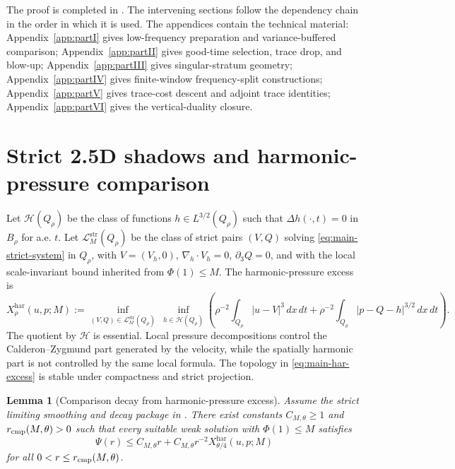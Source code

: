\documentclass[11pt]{article}
\numberwithin{equation}{section}
\theoremstyle{plain}
\newtheorem{lemma}{Lemma}[section]
\theoremstyle{definition}
\theoremstyle{remark}
\newcommand{\har}{\mathrm{har}}
\newcommand{\str}{\mathrm{str}}
\newcommand{\calH}{\mathcal H}
\newcommand{\calL}{\mathcal L}
\begin{document}
The proof is completed in .  The intervening sections follow the dependency chain in the order in which it is used.  The appendices contain the technical material: Appendix~\ref{app:partI} gives low-frequency preparation and variance-buffered comparison; Appendix~\ref{app:partII} gives good-time selection, trace drop, and blow-up; Appendix~\ref{app:partIII} gives singular-stratum geometry; Appendix~\ref{app:partIV} gives finite-window frequency-split constructions; Appendix~\ref{app:partV} gives trace-cost descent and adjoint trace identities; Appendix~\ref{app:partVI} gives the vertical-duality closure.

\section{Strict 2.5D shadows and harmonic-pressure comparison}\label{sec:main-comparison}

Let \(\calH(Q_\rho)\) be the class of functions \(h\in L^{3/2}(Q_\rho)\) such that \(\Delta h(\cdot,t)=0\) in \(B_\rho\) for a.e. \(t\).  Let \(\calL_M^{\str}(Q_\rho)\) be the class of strict pairs \((V,Q)\) solving \eqref{eq:main-strict-system} in \(Q_\rho\), with \(V=(V_h,0)\), \(\nabla_h\cdot V_h=0\), \(\partial_3Q=0\), and with the local scale-invariant bound inherited from \(\Phi(1)\le M\).  The harmonic-pressure excess is
\begin{equation}\label{eq:main-har-excess}
X^{\har}_\rho(u,p;M):=
\inf_{(V,Q)\in\calL_M^{\str}(Q_\rho)}\ \inf_{h\in\calH(Q_\rho)}
\left(
\rho^{-2}\int_{Q_\rho}|u-V|^3\,dx\,dt
+
\rho^{-2}\int_{Q_\rho}|p-Q-h|^{3/2}\,dx\,dt
\right).
\end{equation}
The quotient by \(\calH\) is essential.  Local pressure decompositions control the Calderon--Zygmund part generated by the velocity, while the spatially harmonic part is not controlled by the same local formula.  The topology in \eqref{eq:main-har-excess} is stable under compactness and strict projection.

\begin{lemma}[Comparison decay from harmonic-pressure excess]\label{lem:main-comparison-decay}
Assume the strict limiting smoothing and decay package in .  There exist constants \(C_{M,\theta}\ge1\) and \(r_{\rm cmp}(M,\theta)>0\) such that every suitable weak solution with \(\Phi(1)\le M\) satisfies
\begin{equation}\label{eq:main-comparison-decay}
        \Psi(r)\le C_{M,\theta}r+C_{M,\theta}r^{-2}X^{\har}_{\theta/4}(u,p;M)
\end{equation}
for all \(0<r\le r_{\rm cmp}(M,\theta)\).
\end{lemma}
\end{document}
